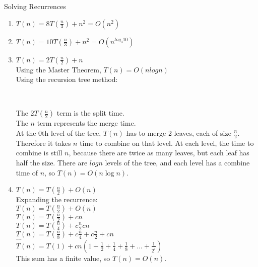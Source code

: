 \documentclass[12pt,twoside]{article}
\begin{document}
\begin{problems}
\begin{problemparts}
\problempart Solving Recurrences
\begin{enumerate}
	\item $T(n) = 8T(\frac{n}{3})+ n^2 = O(n^2)$
	\item $T(n) = 10T(\frac{n}{3})+ n^2 = O(n^{log_3 10})$
	\item $T(n) = 2T(\frac{n}{2})+ n$ \\
	Using the Master Theorem, $T(n)=O(n log n)$ \\
	Using the recursion tree method: \\
	
	
 \\
\bigskip

The $2T(\frac{n}{2})$ term is the split time.\\
The $n$ term represents the merge time. \\
 
At the 0th level of the tree, $T(n)$ has to merge 2 leaves, each of size $\frac{n}{2}$. Therefore it takes $n$ time to combine on that level. At each level, the time to combine is still $n$, because there are twice as many leaves, but each leaf has half the size. There are $logn$ levels of the tree, and each level has a combine time of $n$, so $T(n) = O(n \log n)$.

	\vspace{5mm}
	
	\item $T(n) = T(\frac{n}{2})+ O(n)$ \\
	Expanding the recurrence: \\
	$T(n) = T(\frac{n}{2}) + O(n)$ \\
	$T(n) = T(\frac{n}{2}) + cn $\\
	$T(n) = T(\frac{n}{4}) + c\frac{n}{2} cn$ \\
	$T(n) = T(\frac{n}{8}) + c\frac{n}{4} + c\frac{n}{2} + cn $\\
	$...$ \\
	$T(n) = T(1) + cn(1 + \frac{1}{2} + \frac{1}{4} + \frac{1}{8} + ... + \frac{1}{2^i})$ \\
	This sum has a finite value, so $T(n) = O(n)$.


\end{enumerate}
\end{problemparts}
\end{problems}
\end{document}

